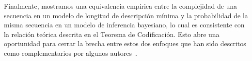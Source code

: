 
Finalmente, mostramos una equivalencia empírica entre la complejidad de una secuencia en un modelo de longitud de descripción mínima y la probabilidad de la misma secuencia en un modelo de inferencia bayesiano, lo cual es consistente con la relación teórica descrita en el Teorema de Codificación. Esto abre una oportunidad para cerrar la brecha entre estos dos enfoques que han sido descritos como complementarios por algunos autores~\cite{mackay2003information}.

